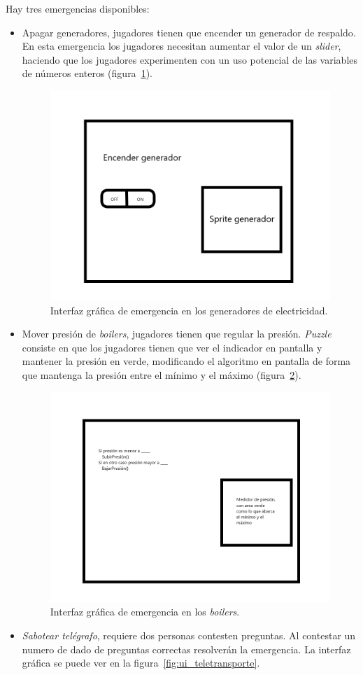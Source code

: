 Hay tres emergencias disponibles:
\begin{itemize}
    \item Apagar generadores, jugadores tienen que encender un generador de respaldo. En esta emergencia los jugadores necesitan aumentar el valor de un \textit{slider}, haciendo que los jugadores experimenten con un uso potencial de las variables de números enteros (figura~\ref{fig:ui_sab_generador}).
        \begin{figure}[H]
        \centering
        \includegraphics[width=0.5\linewidth]{images/SabotageGenerador.png}
        \caption{Interfaz gráfica de emergencia en los generadores de electricidad.}
        \label{fig:ui_sab_generador}
    \end{figure}
    \item Mover presión de \textit{boilers}, jugadores tienen que regular la presión. \textit{Puzzle} consiste en que los jugadores tienen que ver el indicador en pantalla y mantener la presión en verde, modificando el algoritmo en pantalla de forma que mantenga la presión entre el mínimo y el máximo (figura~\ref{fig:ui_sab_presion}).
    \begin{figure}[H]
        \centering
        \includegraphics[width=0.5\linewidth]{images/SabotagePresion.png}
        \caption{Interfaz gráfica de emergencia en los \textit{boilers}.}
        \label{fig:ui_sab_presion}
    \end{figure}
    \item \textit{Sabotear telégrafo}, requiere dos personas contesten preguntas. Al contestar un numero de dado de preguntas correctas resolverán la emergencia. La interfaz gráfica se puede ver en la figura~\ref{fig:ui_teletransporte}.

\end{itemize}
